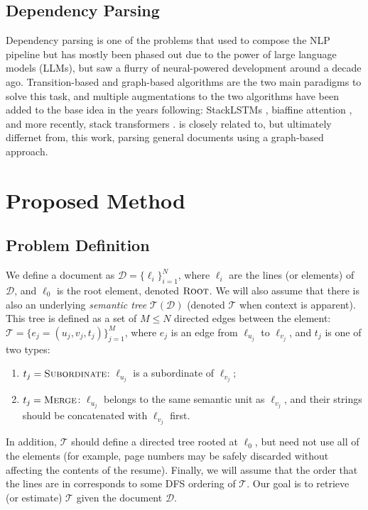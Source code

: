 \documentclass[11pt]{article}
\begin{document}
\subsection{Dependency Parsing}
	Dependency parsing is one of the problems that used to compose the NLP pipeline but has mostly been phased out due to the power of large language models (LLMs), but saw a flurry of neural-powered development around a decade ago. Transition-based \citep{dozat2018simpler} and graph-based \citep{mcdonald2005non} algorithms are the two main paradigms to solve this task, and multiple augmentations to the two algorithms have been added to the base idea in the years following: StackLSTMs \citep{dyer2015transition}, biaffine attention \citep{dozat2016deep}, and more recently, stack transformers \citep{astudillo2020transition}. \citet{hwang2020spatial} is closely related to, but ultimately differnet from, this work, parsing general documents using a graph-based approach.
\section{Proposed Method}
\subsection{Problem Definition}
We define a document as $\mathcal{D} = \{\ell_i\}_{i = 1}^{N}$, where $\ell_i$ are the lines (or elements) of $\mathcal{D}$, and $\ell_0$ is the root element, denoted $\textsc{Root}$. We will also assume that there is also an underlying \emph{semantic tree} $\mathcal{T}(\mathcal{D})$ (denoted $\mathcal{T}$ when context is apparent). This tree is defined as a set of $M \le N$ directed edges between the element: $\mathcal{T} = \{e_j = (u_j, v_j, t_j)\}_{j = 1}^{M}$, where $e_j$ is an edge from $\ell_{u_j}$ to $\ell_{v_j}$, and $t_j$ is one of two types: 
\begin{enumerate}
	\item $t_j = \textsc{Subordinate}$: $\ell_{u_j}$ is a subordinate of $\ell_{v_j}$;
	\item $t_j = \textsc{Merge}$: $\ell_{u_j}$ belongs to the same semantic unit as $\ell_{v_j}$, and their strings should be concatenated with $\ell_{v_j}$ first.
\end{enumerate}
In addition, $\mathcal{T}$ should define a directed tree rooted at $\ell_0$, but need not use all of the elements (for example, page numbers may be safely discarded without affecting the contents of the resume). Finally, we will assume that the order that the lines are in corresponds to some DFS ordering of $\mathcal{T}$. Our goal is to retrieve (or estimate) $\mathcal{T}$ given the document $\mathcal{D}$. 
\end{document}
